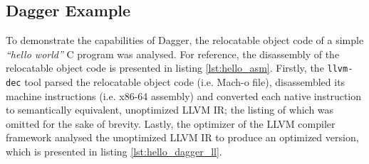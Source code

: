 
\subsection{Dagger Example}
\label{app:dagger_example}

To demonstrate the capabilities of Dagger, the relocatable object code of a simple \textit{``hello world''} C program was analysed. For reference, the disassembly of the relocatable object code is presented in listing \ref{lst:hello_asm}. Firstly, the \texttt{llvm-dec} tool parsed the relocatable object code (i.e. Mach-o file), disassembled its machine instructions (i.e. x86-64 assembly) and converted each native instruction to semantically equivalent, unoptimized LLVM IR; the listing of which was omitted for the sake of brevity. Lastly, the optimizer of the LLVM compiler framework analysed the unoptimized LLVM IR to produce an optimized version, which is presented in listing \ref{lst:hello_dagger_ll}.




